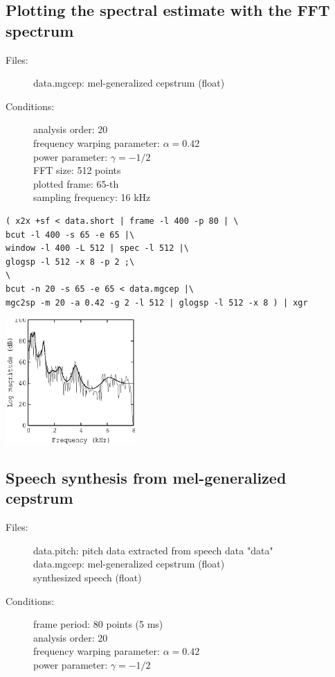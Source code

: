 \documentclass[a4paper,10pt]{article}
\begin{document}
\subsection{Plotting the spectral estimate with the FFT spectrum}

\begin{description}
\item[Files:]
  data.mgcep: mel-generalized cepstrum (float)
\item[Conditions:]
  analysis order: 20\\
  frequency warping parameter: $\alpha = 0.42$\\
  power parameter: $\gamma = -1/2$\\
  FFT size: 512 points\\
  plotted frame: 65-th\\
  sampling frequency: 16 kHz
\end{description}

\begin{verbatim}
( x2x +sf < data.short | frame -l 400 -p 80 | \
bcut -l 400 -s 65 -e 65 |\
window -l 400 -L 512 | spec -l 512 |\
glogsp -l 512 -x 8 -p 2 ;\
\
bcut -n 20 -s 65 -e 65 < data.mgcep |\
mgc2sp -m 20 -a 0.42 -g 2 -l 512 | glogsp -l 512 -x 8 ) | xgr
\end{verbatim}

\includegraphics[width=5cm]{data.mgcep.glogsp.eps}

\subsection{Speech synthesis from mel-generalized cepstrum}

\begin{description}
\item[Files:]
  data.pitch: pitch data extracted from speech data "data"\\
  data.mgcep: mel-generalized cepstrum (float)\\
  synthesized speech (float)
\item[Conditions:]
  frame period: 80 points (5 ms)\\
  analysis order: 20\\
  frequency warping parameter: $\alpha = 0.42$\\
  power parameter: $\gamma = -1/2$
\end{description}
\end{document}

